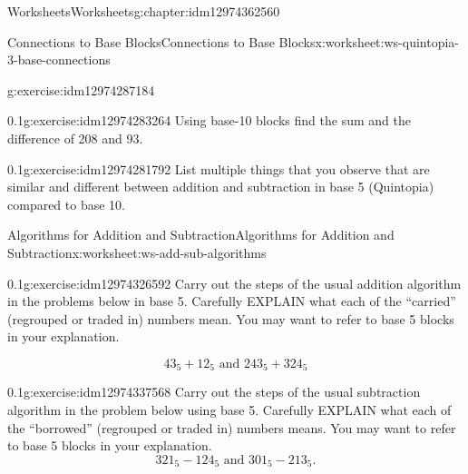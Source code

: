 \documentclass[twoside,11pt,]{book}
\begin{document}
\begin{chapterptx}{Worksheets}{}{Worksheets}{}{}{g:chapter:idm12974362560}
\begin{worksheet-section-numberless}{Connections to Base Blocks}{}{Connections to Base Blocks}{}{}{x:worksheet:ws-quintopia-3-base-connections}
\begin{divisionexercise}{3}{}{}{g:exercise:idm12974287184}
\begin{enumerate}[label=(\alph*)]
\end{enumerate}
\end{divisionexercise}%
\begin{divisionexercise}{4}{}{0.1}{g:exercise:idm12974283264}%
Using base-10 blocks find the sum and the difference of 208 and 93.%
\end{divisionexercise}%
\begin{divisionexercise}{5}{}{0.1}{g:exercise:idm12974281792}%
List multiple things that you observe that are similar and different between addition and subtraction in base 5 (Quintopia) compared to base 10.%
\end{divisionexercise}%
\end{worksheet-section-numberless}
\restoregeometry
%
%
\typeout{************************************************}
\typeout{************************************************}
%
\begin{worksheet-section-numberless}{Algorithms for Addition and Subtraction}{}{Algorithms for Addition and Subtraction}{}{}{x:worksheet:ws-add-sub-algorithms}
\begin{divisionexercise}{1}{}{0.1}{g:exercise:idm12974326592}%
Carry out the steps of the usual addition algorithm in the problems below in base 5.  Carefully EXPLAIN what each of the ``carried'' (regrouped or traded in) numbers mean.  You may want to refer to base 5 blocks in your explanation.%
\par
%
\begin{equation*}
43_{5}+12_{5} \text{ and } 243_{5}+324_{5}
\end{equation*}
%
\end{divisionexercise}%
\clearpage
\begin{divisionexercise}{2}{}{0.1}{g:exercise:idm12974337568}%
Carry out the steps of the usual subtraction algorithm in the problem below using base 5.  Carefully EXPLAIN what each of the ``borrowed'' (regrouped or traded in) numbers means.  You may want to refer to base 5 blocks in your explanation.%
\begin{equation*}
321_{5}-124_5 \text{ and } 301_5-213_5 \text{.}
\end{equation*}
%
\end{divisionexercise}%
\end{worksheet-section-numberless}
\restoregeometry
%
%
\typeout{************************************************}
\typeout{************************************************}

\end{chapterptx}
\end{document}
